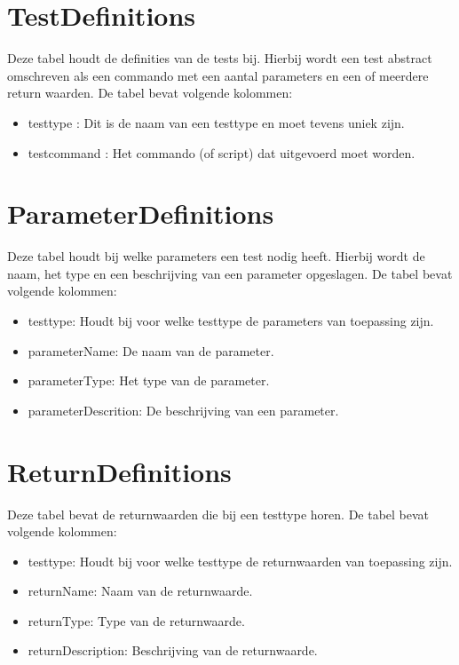 \section{TestDefinitions}
Deze tabel houdt de definities van de tests bij.
Hierbij wordt een test abstract omschreven als een commando met een aantal parameters en een of meerdere return waarden. De tabel bevat volgende kolommen:
\begin{itemize}
\item testtype : Dit is de naam van een testtype en moet tevens uniek zijn.
\item testcommand : Het commando (of script) dat uitgevoerd moet worden.
\end{itemize}
\section{ParameterDefinitions}
Deze tabel houdt bij welke parameters een test nodig heeft. Hierbij wordt de naam, het type en een beschrijving van een parameter opgeslagen. De tabel bevat volgende kolommen:
\begin{itemize}
\item testtype: Houdt bij voor welke testtype de parameters van toepassing zijn.
\item parameterName: De naam van de parameter.
\item parameterType: Het type van de parameter.
\item parameterDescrition: De beschrijving van een parameter.
\end{itemize}
\section{ReturnDefinitions}
Deze tabel bevat de returnwaarden die bij een testtype horen. De tabel bevat volgende kolommen:
\begin{itemize}
\item testtype: Houdt bij voor welke testtype de returnwaarden van toepassing zijn.
\item returnName: Naam van de returnwaarde.
\item returnType: Type van de returnwaarde.
\item returnDescription: Beschrijving van de returnwaarde.
\end{itemize}

